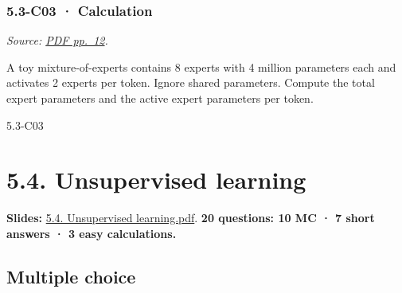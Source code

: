 \noindent\begin{minipage}{\linewidth}

\subsubsection{5.3-C03 · Calculation}\label{c03-calculation-14}

\emph{Source:
\href{../Lecture\%20Slides/5.3.\%20Foundation\%20models.pdf\#page=12}{PDF
pp.~12}.}

A toy mixture-of-experts contains 8 experts with 4 million parameters
each and activates 2 experts per token. Ignore shared parameters.
Compute the total expert parameters and the active expert parameters per
token.

\begin{solution}[26mm]{5.3-C03}

\end{solution}
\end{minipage}\par\medskip

\clearpage

\section{5.4. Unsupervised learning}\label{unsupervised-learning}

\textbf{Slides:}
\href{../Lecture\%20Slides/5.4.\%20Unsupervised\%20learning.pdf}{5.4.
Unsupervised learning.pdf}. \textbf{20 questions: 10 MC · 7 short
answers · 3 easy calculations.}

\subsection{Multiple choice}\label{multiple-choice-16}

